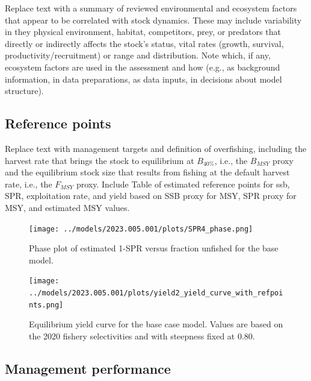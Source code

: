 \documentclass[11pt,
  english,
  letterpaper,
]{article}
\begin{document}
Replace text with a summary of reviewed environmental and ecosystem factors that appear to be correlated with stock dynamics. These may include variability in they physical environment, habitat, competitors, prey, or predators that directly or indirectly affects the stock's status, vital rates (growth, survival, productivity/recruitment) or range and distribution. Note which, if any, ecosystem factors are used in the assessment and how (e.g., as background information, in data preparations, as data inputs, in decisions about model structure).

\hypertarget{reference-points}{%
\subsection*{Reference points}\label{reference-points}}

Replace text with management targets and definition of overfishing, including the harvest rate that brings the stock to equilibrium at \(B_{40\%}\), i.e., the \(B_{MSY}\) proxy and the equilibrium stock size that results from fishing at the default harvest rate, i.e., the \(F_{MSY}\) proxy. Include Table of estimated reference points for ssb, SPR, exploitation rate, and yield based on SSB proxy for MSY, SPR proxy for MSY, and estimated MSY values.

\begin{figure}
\centering
\texttt{[image: ../models/2023.005.001/plots/SPR4\_phase.png]}
\caption{Phase plot of estimated 1-SPR versus fraction unfished for the base model.\label{fig:es-phase}}
\end{figure}

\begin{figure}
\centering
\texttt{[image: ../models/2023.005.001/plots/yield2\_yield\_curve\_with\_refpoints.png]}
\caption{Equilibrium yield curve for the base case model. Values are based on the 2020 fishery selectivities and with steepness fixed at 0.80.\label{fig:es-yield}}
\end{figure}



\clearpage

\hypertarget{management-performance}{%
\subsection*{Management performance}\label{management-performance}}
\end{document}

